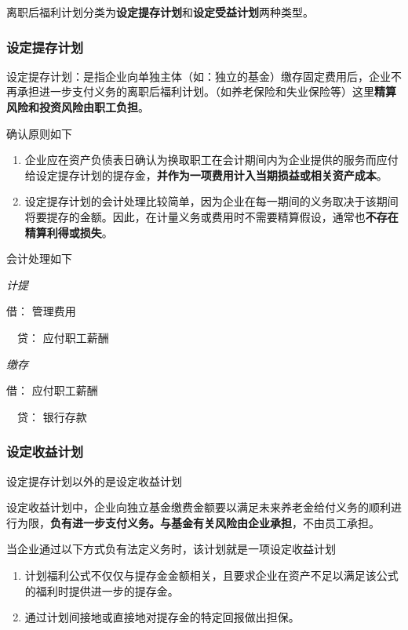 \documentclass[UTF8,12pt]{ctexart}
\newenvironment{Dr}{\noindent 借：}{\par}
\newenvironment{Cr}{\noindent \ \ 贷：}{\par}
\numberwithin{equation}{section} %
\numberwithin{figure}{section}
\numberwithin{table}{section}
\begin{document}
	离职后福利计划分类为\textbf{设定提存计划}和\textbf{设定受益计划}两种类型。
	
	\subsubsection{设定提存计划}
	设定提存计划：是指企业向单独主体（如：独立的基金）缴存固定费用后，企业不再承担进一步支付义务的离职后福利计划。（如养老保险和失业保险等）这里\textbf{精算风险和投资风险由职工负担}。
	
	确认原则如下
	\begin{enumerate}
		\item 企业应在资产负债表日确认为换取职工在会计期间内为企业提供的服务而应付给设定提存计划的提存金，\textbf{并作为一项费用计入当期损益或相关资产成本}。
		
		\item 设定提存计划的会计处理比较简单，因为企业在每一期间的义务取决于该期间将要提存的金额。因此，在计量义务或费用时不需要精算假设，通常也\textbf{不存在精算利得或损失}。
	\end{enumerate}
	
	会计处理如下
	
	\textit{计提}
	
	\begin{Dr}
		管理费用
	\end{Dr}
	\begin{Cr}
		应付职工薪酬
	\end{Cr}

	\textit{缴存}

	\begin{Dr}
		应付职工薪酬
	\end{Dr}
	\begin{Cr}
		银行存款
	\end{Cr}
	
	\subsubsection{设定收益计划}
	设定提存计划以外的是设定收益计划
	
	设定收益计划中，企业向独立基金缴费金额要以满足未来养老金给付义务的顺利进行为限，\textbf{负有进一步支付义务。与基金有关风险由企业承担}，不由员工承担。
	
	当企业通过以下方式负有法定义务时，该计划就是一项设定收益计划
	\begin{enumerate}
		\item 计划福利公式不仅仅与提存金金额相关，且要求企业在资产不足以满足该公式的福利时提供进一步的提存金。
		
		\item 通过计划间接地或直接地对提存金的特定回报做出担保。
	\end{enumerate}
\end{document}
